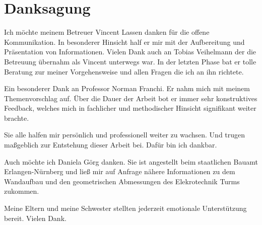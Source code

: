 \chapter{Danksagung}
%
Ich möchte meinem Betreuer Vincent Lassen danken für die offene Kommunikation.
In besonderer Hinsicht half er mir mit der Aufbereitung und Präsentation von Informationen.
Vielen Dank auch an Tobias Veihelmann der die Betreuung übernahm als Vincent unterwegs war.
In der letzten Phase bat er tolle Beratung zur meiner Vorgehensweise und allen Fragen die ich an ihn richtete.

Ein besonderer Dank an Professor Norman Franchi.
Er nahm mich mit meinem Themenvorschlag auf.
Über die Dauer der Arbeit bot er immer sehr konstruktives Feedback, welches mich in fachlicher und methodischer Hinsicht signifikant weiter brachte.

Sie alle halfen mir persönlich und professionell weiter zu wachsen.
Und trugen maßgeblich zur Entstehung dieser Arbeit bei.
Dafür bin ich dankbar.

Auch möchte ich Daniela Görg danken.
Sie ist angestellt beim staatlichen Bauamt Erlangen-Nürnberg und ließ mir auf Anfrage nähere Informationen zu dem Wandaufbau und den geometrischen Abmessungen des Elekrotechnik Turms zukommen.

Meine Eltern und meine Schwester stellten jederzeit emotionale Unterstützung bereit.
Vielen Dank.
